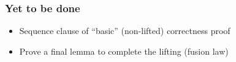     \begin{frame}
        \frametitle{Yet to be done}

        \begin{itemize}
            \item Sequence clause of ``basic'' (non-lifted) correctness proof

            \item Prove a final lemma to complete the lifting (fusion law)
        \end{itemize}
    \end{frame}

